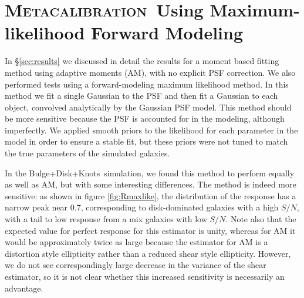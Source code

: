 \documentclass[iop, twocolappendix, appendixfloats, numberedappendix, apj]{emulateapj}
\newcommand{\snr}{$S/N$}
\newcommand{\Mcal}{\textsc{Metacalibration}}
\newcommand{\bdkfull}{Bulge+Disk+Knots}
\begin{document}
\section{\Mcal\ Using Maximum-likelihood Forward Modeling} \label{app:maxlike}

In \S \ref{sec:results} we discussed in detail the results for a moment based
fitting method using adaptive moments (AM), with no explicit PSF correction.
We also performed tests using a forward-modeling maximum likelihood method.
In this method we fit a single Gaussian to the PSF and then fit a Gaussian to each
object, convolved analytically by the Gaussian PSF model.  This method should
be more sensitive because the PSF is accounted for in the modeling, although
imperfectly.  We applied smooth priors to the likelihood for each parameter in
the model in order to ensure a stable fit, but these priors were not tuned to
match the true parameters of the simulated galaxies.

In the \bdkfull\ simulation, we found this method to perform equally as well as
AM, but with some interesting differences.  The method is indeed more
sensitive: as shown in figure \ref{fig:Rmaxlike}, the distribution of the
response has a narrow peak near 0.7, corresponding to disk-dominated galaxies
with a high \snr, with a tail to low response from a mix galaxies with low
\snr.  Note also that the expected value for perfect response for this
estimator is unity, whereas for AM it would be approximately twice as large
because the estimator for AM is a distortion style ellipticity rather than a
reduced shear style ellipticity.  However,  we do not see correspondingly large
decrease in the variance of the shear estimator, so it is not clear whether
this increased sensitivity is necessarily an advantage.
\end{document}
